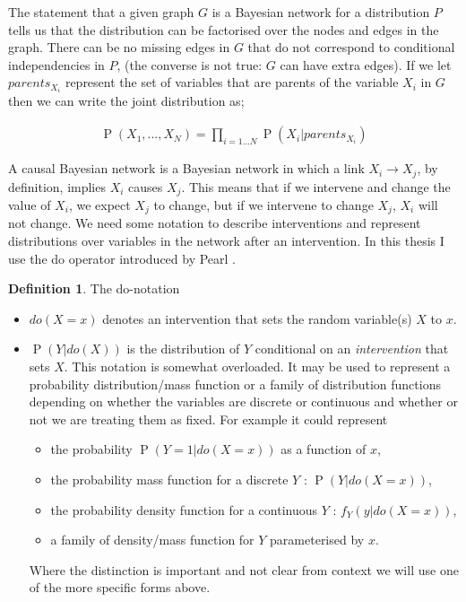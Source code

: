 \documentclass[11pt,a4paper,oneside]{book}
\newcommand{\eqn}[1]{\begin{align}#1\end{align}}
\renewcommand{\P}[1]{\operatorname{P}\left(#1\right)}
\theoremstyle{plain}
\theoremstyle{definition}
\newtheorem{definition}[theorem]{Definition}
\begin{document}
The statement that a given graph $G$ is a Bayesian network for a distribution $P$ tells us that the distribution can be factorised over the nodes and edges in the graph. There can be no missing edges in $G$ that do not correspond to conditional independencies in $P$, (the converse is not true: $G$ can have extra edges). If we let $parents_{X_{i}}$ represent the set of variables that are parents of the variable $X_{i}$ in $G$ then we can write the joint distribution as; 

\eqn{
\P{X_{1},...,X_{N}} = \prod_{i = 1...N}\P{X_{i}|parents_{X_{i}}}
}

A causal Bayesian network is a Bayesian network in which a link $X_{i} \rightarrow X_{j}$, by definition, implies $X_{i}$ causes $X_{j}$. This means that if we intervene and change the value of $X_{i}$, we expect $X_{j}$ to change, but if we intervene to change $X_{j}$, $X_{i}$ will not change. We need some notation to describe interventions and represent distributions over variables in the network after an intervention. In this thesis I use the do operator introduced by Pearl \citep{Pearl2000}.

\vspace{0.5cm}
\begin{definition}{The do-notation}
\begin{itemize}
\item $do(X=x)$ denotes an intervention that sets the random variable(s) $X$ to $x$.
\item $\P{Y|do(X)}$ is the distribution of $Y$ conditional on an \emph{intervention} that sets $X$. This notation is somewhat overloaded. It may be used to represent a probability distribution/mass function or a family of distribution functions depending on whether the variables are discrete or continuous and whether or not we are treating them as fixed. For example it could represent 
\begin{itemize}
\item the probability $\P{Y=1|do(X=x)}$ as a function of $x$,
\item the probability mass function for a discrete $Y$ : $\P{Y|do(X=x)}$,
\item the probability density function for a continuous  $Y$ : $f_Y(y|do(X=x))$,
\item a family of density/mass function for $Y$ parameterised by $x$.
\end{itemize}
Where the distinction is important and not clear from context we will use one of the more specific forms above. 
\end{itemize}
\end{definition}
\end{document}

